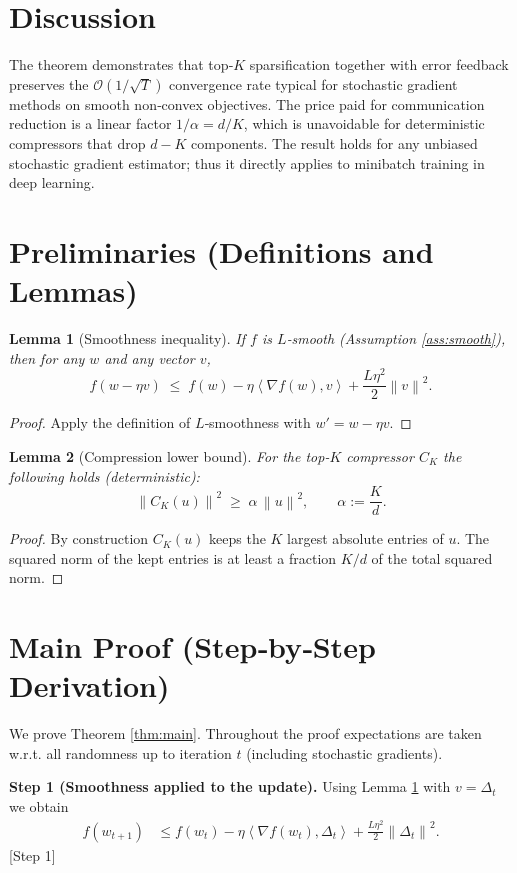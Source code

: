 \documentclass{article}
\newtheorem{lemma}{Lemma}
\newcommand{\norm}[1]{\left\|#1\right\|}
\newcommand{\ip}[2]{\left\langle #1,#2\right\rangle}
\begin{document}
\section*{Discussion}
The theorem demonstrates that top‑$K$ sparsification together with error feedback preserves the $\mathcal{O}(1/\sqrt{T})$ convergence rate typical for stochastic gradient methods on smooth non‑convex objectives. The price paid for communication reduction is a linear factor $1/\alpha= d/K$, which is unavoidable for deterministic compressors that drop $d-K$ components. The result holds for any unbiased stochastic gradient estimator; thus it directly applies to minibatch training in deep learning.

\newpage
\section*{Preliminaries (Definitions and Lemmas)}
\begin{lemma}[Smoothness inequality]\label{lem:smooth}
If $f$ is $L$‑smooth (Assumption \ref{ass:smooth}), then for any $w$ and any vector $v$,
\[
f(w - \eta v)\;\le\; f(w)-\eta\ip{\nabla f(w)}{v}+\frac{L\eta^{2}}{2}\norm{v}^{2}.
\]
\end{lemma}
\begin{proof}
Apply the definition of $L$‑smoothness with $w'=w-\eta v$. \hfill\qedsymbol
\end{proof}

\begin{lemma}[Compression lower bound]\label{lem:compress}
For the top‑$K$ compressor $C_{K}$ the following holds (deterministic):
\[
\norm{C_{K}(u)}^{2}\;\ge\;\alpha\,\norm{u}^{2},\qquad\alpha:=\frac{K}{d}.
\]
\end{lemma}
\begin{proof}
By construction $C_{K}(u)$ keeps the $K$ largest absolute entries of $u$. The squared norm of the kept entries is at least a fraction $K/d$ of the total squared norm. \hfill\qedsymbol
\end{proof}

\section*{Main Proof (Step‑by‑Step Derivation)}
We prove Theorem \ref{thm:main}. Throughout the proof expectations are taken w.r.t. all randomness up to iteration $t$ (including stochastic gradients).

\bigskip
\noindent\textbf{Step 1 (Smoothness applied to the update).}  
Using Lemma \ref{lem:smooth} with $v=\Delta_t$ we obtain
\begin{align}
f(w_{t+1})
&\le f(w_t)-\eta\ip{\nabla f(w_t)}{\Delta_t}
      +\frac{L\eta^{2}}{2}\norm{\Delta_t}^{2}. \label{eq:smooth-step}
\end{align}
[Step 1]
\end{document}
